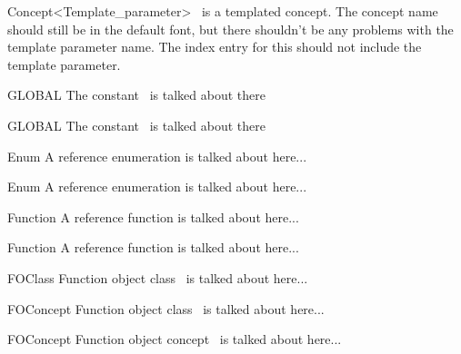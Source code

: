 \documentclass[12pt]{article}
\begin{document}
{\begin{ccRefConcept}{Concept<Template_parameter>}
\ccRefName\ is a templated concept.  The concept name should still be in
the default font, but there shouldn't be any problems with the template
parameter name.  The index entry for this should not include the template
parameter.

\ccTypes


\ccPredicates


\end{ccRefConcept}

\begin{ccRefConstant}{GLOBAL}
The constant \ccRefName\ is talked about there
\end{ccRefConstant}

\begin{ccRefConstant}[Concept::]{GLOBAL}
The constant \ccRefScope\ccRefName\ is talked about there
\end{ccRefConstant}

\begin{ccRefEnum}[Class::]{Enum}
A reference enumeration is talked about here...
\end{ccRefEnum}

\begin{ccRefEnum}{Enum}
A reference enumeration is talked about here...
\end{ccRefEnum}

\begin{ccRefFunction}[Class::]{Function}
A reference function is talked about here...
\end{ccRefFunction}

\begin{ccRefFunction}{Function}
A reference function is talked about here...
\end{ccRefFunction}

\begin{ccRefFunctionObjectClass}{FOClass}
Function object class \ccRefName\ is talked about here...
\end{ccRefFunctionObjectClass}

\begin{ccRefFunctionObjectClass}[Kernel::]{FOConcept}
Function object class \ccRefScope\ccRefName\ is talked about here...
\end{ccRefFunctionObjectClass}

\begin{ccRefFunctionObjectConcept}{FOConcept}
Function object concept \ccRefName\ is talked about here...
\end{ccRefFunctionObjectConcept}

}
\end{document}
